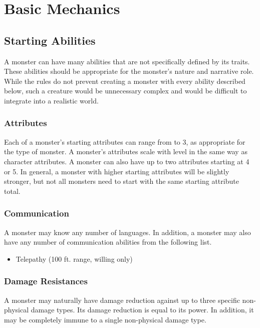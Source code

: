 \chapter{Basic Mechanics}

\section{Starting Abilities}\label{Starting Abilities}

    A monster can have many abilities that are not specifically defined by its traits.
    These abilities should be appropriate for the monster's nature and narrative role.
    While the rules do not prevent creating a monster with every ability described below, such a creature would be unnecessary complex and would be difficult to integrate into a realistic world.

    \subsection{Attributes}
        Each of a monster's starting attributes can range from  to 3, as appropriate for the type of monster.
        A monster's attributes scale with level in the same way as character attributes.
        A monster can also have up to two attributes starting at 4 or 5.
        In general, a monster with higher starting attributes will be slightly stronger, but not all monsters need to start with the same starting attribute total.

    \subsection{Communication}
        A monster may know any number of languages.
        In addition, a monster may also have any number of communication abilities from the following list.
        \begin{itemize}
            \item Telepathy (100 ft. range, willing only)
        \end{itemize}

    \subsection{Damage Resistances}
        A monster may naturally have damage reduction against up to three specific non-physical damage types.
        Its damage reduction is equal to its power.
        In addition, it may be completely immune to a single non-physical damage type.

